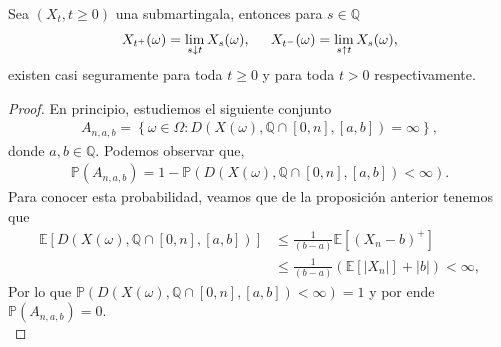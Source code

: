 \begin{theorem}
\label{teo_exist_tmas}
	Sea $(X_t, t \geq 0)$ una submartingala, entonces para $s \in \mathbb{Q}$
    \begin{align*}
		X_{t^{+}} (\omega) = \lim_{s \downarrow t} X_s (\omega), \hspace{0.5cm} X_{t^{-}} (\omega) = \lim_{s \uparrow t} X_s (\omega),
	\end{align*}
existen casi seguramente para toda $t \geq 0$ y para toda $t > 0$ respectivamente.
\end{theorem}
\begin{proof}
	En principio, estudiemos el siguiente conjunto
    \begin{align*}
		A_{n, a, b} = \left\{ \omega \in \Omega : D(X(\omega), \mathbb{Q} \cap [0, n], [a, b]) = \infty \right\}, 
	\end{align*}
donde $a, b \in \mathbb{Q}$. Podemos observar que, 
\begin{align*}
	\mathbb{P}(A_{n, a, b}) = 1 - \mathbb{P}\left( D(X(\omega), \mathbb{Q} \cap [0, n], [a, b]) < \infty \right).
\end{align*}
Para conocer esta probabilidad, veamos que de la proposición anterior tenemos que
\begin{align*}
	\mathbb{E} \left[ D(X(\omega), \mathbb{Q} \cap [0, n], [a, b]) \right] & \leq \frac{1}{(b-a)} \mathbb{E} \left[ (X_n - b)^{+} \right] \\
    & \leq \frac{1}{(b-a)} \left( \mathbb{E}[|X_n|] + |b| \right) < \infty,
\end{align*}
Por lo que  $\mathbb{P}\left( D(X(\omega), \mathbb{Q} \cap [0, n], [a, b]) < \infty \right) = 1$ y por ende $\mathbb{P}(A_{n, a, b}) = 0$. \\


\end{proof}
